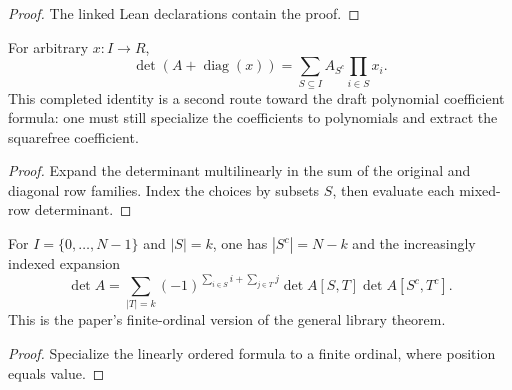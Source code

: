 \begin{proof}

\leanok

The linked Lean declarations contain the proof.

\end{proof}

\begin{theorem}

\label{thm:diagonal-expansion}


\leanok


For arbitrary $x:I\to R$,
\[ \det(A+\operatorname{diag}(x))=\sum_{S\subseteq I}A_{S^c}\prod_{i\in S}x_i. \]
This completed identity is a second route toward the draft polynomial coefficient formula:
one must still specialize the coefficients to polynomials and extract the squarefree coefficient.

\end{theorem}

\begin{proof}

\leanok

Expand the determinant multilinearly in the sum of the original and diagonal row
families. Index the choices by subsets $S$, then evaluate each mixed-row determinant.

\end{proof}

\begin{theorem}

\label{thm:fin-laplace}


\leanok


For $I=\{0,\ldots,N-1\}$ and $|S|=k$, one has $|S^c|=N-k$ and the increasingly
indexed expansion
\[ \det A=\sum_{|T|=k}(-1)^{\sum_{i\in S}i+\sum_{j\in T}j}
 \det A[S,T]\det A[S^c,T^c]. \]
This is the paper's finite-ordinal version of the general library theorem.

\end{theorem}

\begin{proof}

\leanok

Specialize the linearly ordered formula to a finite ordinal, where position equals value.

\end{proof}

